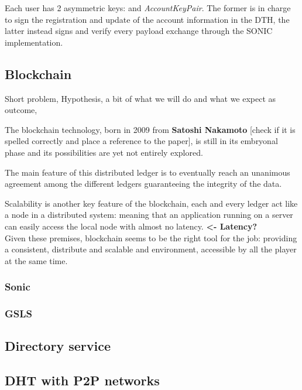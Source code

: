 Each user has 2 asymmetric keys:  and \textit{AccountKeyPair}. The former is in charge to sign the registration and update of the account information in the DTH, the latter instead signs and verify every payload exchange through the SONIC implementation.

\subsection{Blockchain}

Short problem, 
Hypothesis,
a bit of what we will do and what we expect as outcome,

The blockchain technology, born in 2009 from \textbf{Satoshi Nakamoto} [check if it is spelled correctly and place a reference to the paper], is still in its embryonal phase and its possibilities are yet not entirely explored.

The main feature of this distributed ledger is to eventually reach an unanimous agreement among the different ledgers guaranteeing the integrity of the data. 

Scalability is another key feature of the blockchain, each and every ledger act like a node in a distributed system: meaning that an application running on a server can easily access the local node with almost no latency. \textbf{<- Latency? }
\\
Given these premises, blockchain seems to be the right tool for the job: providing a consistent, distribute and scalable and environment, accessible by all the player at the same time.






\subsubsection{Sonic}
\subsubsection{GSLS}


\subsection{Directory service}



\subsection{DHT with P2P networks}


